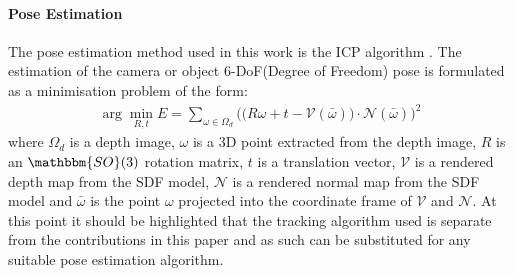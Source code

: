 \paragraph{Pose Estimation}
The pose estimation method used in this work is the ICP algorithm \cite{Besl1992}. The estimation of 
the camera or object 6-DoF(Degree of Freedom) pose is formulated as a minimisation problem of the form:
\begin{equation}
	\begin{split}
		\arg \min_{R, t} E = \sum_{\omega \in \Omega_{d}} \bigg( \big( R\omega + t - \mathcal{V}(\bar{\omega}) \big) \cdot \mathcal{N}(\bar{\omega}) \bigg)^{2}
	\end{split}
\end{equation}
where $\Omega_{d}$ is a depth image, $\omega$ is a 3D point extracted from the depth image, $R$ is an  $\mathbbm{SO}(3)$ 
rotation matrix, $t$ is a translation vector, $\mathcal{V}$ is a rendered depth map from the SDF model, $\mathcal{N}$ is a rendered 
normal map from the SDF model and $\bar{\omega}$ is the point $\omega$ projected into the coordinate frame of $\mathcal{V}$ and 
$\mathcal{N}$. At this point it should be highlighted that the tracking algorithm used is separate from the contributions in this paper and 
as such can be substituted for any suitable pose estimation algorithm.


